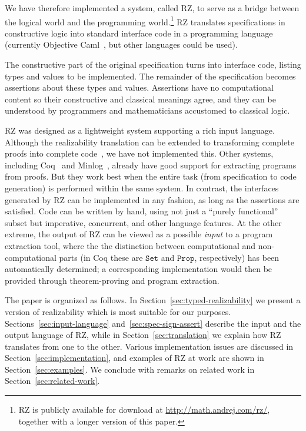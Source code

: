 
We have therefore implemented a system, called RZ, to serve as a
bridge between the logical world and the programming world.\footnote{RZ
  is publicly available for download at
  \url{http://math.andrej.com/rz/}, together with a longer version of
  this paper.} RZ translates specifications in
constructive logic into standard interface code in a programming
language (currently Objective Caml~\cite{ocaml}, but other languages
could be used).

The constructive part of the original specification turns into
interface code,
listing types and values to be implemented. The remainder of
the specification becomes assertions about these types and values.
Assertions have no computational content so their constructive
and classical meanings agree, and they can
be understood by programmers and mathematicians accustomed to
classical logic.


RZ was designed as a lightweight system
supporting a rich input language. Although the
realizability translation can be extended to transforming complete
proofs into complete code~\cite{komagata+:tr95}, we have not
implemented this. Other systems, including Coq~\cite{coqart} and
Minlog~\cite{benl98:_proof_theor_work}, already have good support for
extracting programs from proofs. But they work best when the entire
task (from specification to code generation) is performed within the
same system. In contrast, the interfaces generated by RZ can be
implemented in any fashion, as long as the assertions are satisfied.
Code can be written by hand, using not just a ``purely functional'' subset
but imperative, concurrent, and other language features. 
\iflong
At the other
extreme, the output of RZ can be viewed as a possible \emph{input} to
a program extraction tool, where the the distinction between
computational and non-computational parts (in Coq these are
$\mathtt{Set}$ and $\mathtt{Prop}$, respectively) has been
automatically determined; a corresponding implementation would then be
provided through theorem-proving and program extraction.


The paper is organized as follows. In
Section~\ref{sec:typed-realizability} we present a version of
realizability which is most suitable for our purposes.
Sections~\ref{sec:input-language} and~\ref{sec:spec-sign-assert}
describe the input and the output language of RZ, while in
Section~\ref{sec:translation} we explain how RZ translates from one to
the other. Various implementation issues are discussed in
Section~\ref{sec:implementation}, and examples of RZ at work are shown
in Section~\ref{sec:examples}. We conclude with remarks on related
work in Section~\ref{sec:related-work}.
\fi %


